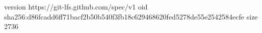 version https://git-lfs.github.com/spec/v1
oid sha256:d86fcadd6ff71bacf2b50b540f3fb18c629468620fed5278de55e2542584ecfe
size 2736
